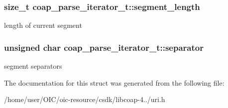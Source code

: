 \subsubsection[{segment\+\_\+length}]{\setlength{\rightskip}{0pt plus 5cm}size\+\_\+t coap\+\_\+parse\+\_\+iterator\+\_\+t\+::segment\+\_\+length}\label{structcoap__parse__iterator__t_a8349e7131718619149694cd5ac337537}
length of current segment \hypertarget{structcoap__parse__iterator__t_a849064fa32d9021c6a634232eb89803f}{}
\subsubsection[{separator}]{\setlength{\rightskip}{0pt plus 5cm}unsigned char coap\+\_\+parse\+\_\+iterator\+\_\+t\+::separator}\label{structcoap__parse__iterator__t_a849064fa32d9021c6a634232eb89803f}
segment separators 

The documentation for this struct was generated from the following file\+:\begin{DoxyCompactItemize}
\item 
/home/user/\+O\+I\+C/oic-\/resource/csdk/libcoap-\/4../uri.\+h\end{DoxyCompactItemize}
